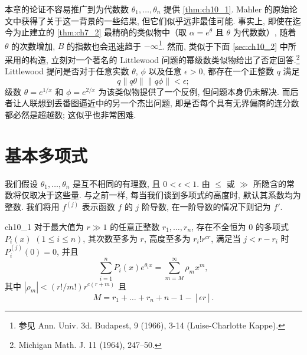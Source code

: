 本章的论证不容易推广到为代数数 $\theta_1, \dots, \theta_n$ 提供 \autoref{thm:ch10_1}. Mahler 的原始论文中获得了关于这一背景的一些结果, 但它们似乎远非最佳可能. 事实上, 即使在迄今为止建立的 \autoref{thm:ch7_2} 最精确的类似物中（取 $\alpha = e^{\theta}$ 且 $\theta$ 为代数数）, 随着 $\theta$ 的次数增加, $B$ 的指数也会迅速趋于 $-\infty$\footnote{ 参见 Ann. Univ. 3d. Budapest, 9 (1966), 3-14 (Luise-Charlotte Kappe).}. 然而, 类似于下面 \autoref{sec:ch10_2} 中所采用的构造, 立刻对一个著名的 Littlewood 问题的幂级数类似物给出了否定回答.\footnote{Michigan Math. J. 11 (1964), 247--50.} Littlewood 提问是否对于任意实数 $\theta$, $\phi$ 以及任意 $\epsilon > 0$, 都存在一个正整数 $q$ 满足
\[q\|q\theta\|\|q\phi\|<\epsilon;\]
级数 $\theta = e^{1/x}$ 和 $\phi = e^{2/x}$ 为该类似物提供了一个反例, 但问题本身仍未解决. 而后者让人联想到丢番图逼近中的另一个杰出问题, 即是否每个具有无界偏商的连分数都必然是超越数; 这似乎也非常困难.

\section{基本多项式}\label{sec:ch10_2}

我们假设 $\theta_1, \ldots, \theta_n$ 是互不相同的有理数, 且 $0 < \epsilon < 1$. 由 $\leqslant$ 或 $\gg$ 所隐含的常数将仅取决于这些量. 与之前一样, 每当我们谈到多项式的高度时, 默认其系数均为整数. 我们将用 $f^{(j)}$ 表示函数 $f$ 的 $j$ 阶导数, 在一阶导数的情况下则记为 $f'$.

\begin{mylemma}{}{ch10_1}
对于最大值为 $r \gg 1$ 的任意正整数 $r_1, \ldots, r_n$, 存在不全恒为 0 的多项式 $P_i(x)$ $(1 \leq i \leq n)$, 其次数至多为 $r$, 高度至多为 $r_i! r^{cr}$, 满足当 $j < r - r_i$ 时 $P_i^{(j)}(0) = 0$, 并且
\[\sum_{i=1}^{n} P_i(x) e^{\theta_i x} = \sum_{m=M}^{\infty} \rho_m x^m, \tag{1}\label{eq:ch10_1}\]
其中 $|\rho_m| < (r!/m!) r^{c(r+m)}$ 且
\[M = r_1 + \ldots + r_n + n - 1 - [\epsilon r].\]
\end{mylemma}

